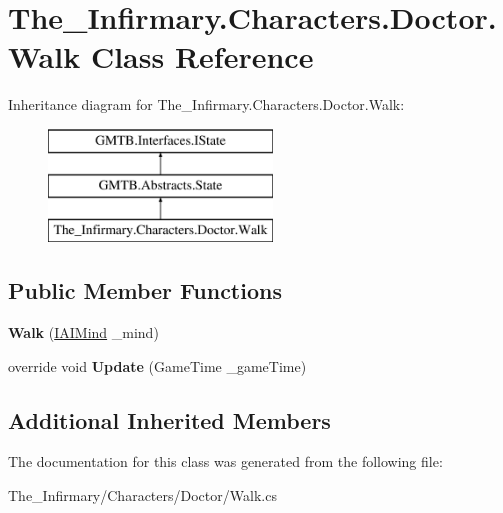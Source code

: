 \hypertarget{class_the___infirmary_1_1_characters_1_1_doctor_1_1_walk}{}\section{The\+\_\+\+Infirmary.\+Characters.\+Doctor.\+Walk Class Reference}
\label{class_the___infirmary_1_1_characters_1_1_doctor_1_1_walk}
Inheritance diagram for The\+\_\+\+Infirmary.\+Characters.\+Doctor.\+Walk\+:\begin{figure}[H]
\begin{center}
\leavevmode
\includegraphics[height=3.000000cm]{class_the___infirmary_1_1_characters_1_1_doctor_1_1_walk}
\end{center}
\end{figure}
\subsection*{Public Member Functions}
\begin{DoxyCompactItemize}
\item 
\mbox{\label{class_the___infirmary_1_1_characters_1_1_doctor_1_1_walk_a76520750da5b6005d87a939589715876}} 
{\bfseries Walk} (\mbox{\hyperlink{interface_g_m_t_b_1_1_interfaces_1_1_i_a_i_mind}{I\+A\+I\+Mind}} \+\_\+mind)
\item 
\mbox{\label{class_the___infirmary_1_1_characters_1_1_doctor_1_1_walk_a79c6be2b1851004793486d71a8ac95ce}} 
override void {\bfseries Update} (Game\+Time \+\_\+game\+Time)
\end{DoxyCompactItemize}
\subsection*{Additional Inherited Members}


The documentation for this class was generated from the following file\+:\begin{DoxyCompactItemize}
\item 
The\+\_\+\+Infirmary/\+Characters/\+Doctor/Walk.\+cs\end{DoxyCompactItemize}
